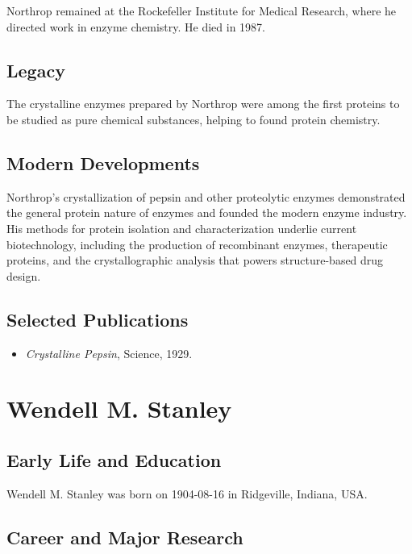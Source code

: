 Northrop remained at the Rockefeller Institute for Medical Research, where he directed work in enzyme chemistry. He died in 1987.

\subsection*{Legacy}

The crystalline enzymes prepared by Northrop were among the first proteins to be studied as pure chemical substances, helping to found protein chemistry.

\subsection*{Modern Developments}

Northrop's crystallization of pepsin and other proteolytic enzymes demonstrated the general protein nature of enzymes and founded the modern enzyme industry. His methods for protein isolation and characterization underlie current biotechnology, including the production of recombinant enzymes, therapeutic proteins, and the crystallographic analysis that powers structure-based drug design.

\subsection*{Selected Publications}

\begin{itemize}

\item \emph{Crystalline Pepsin}, Science, 1929.

\end{itemize}

\clearpage

\section{Wendell M. Stanley}

\subsection*{Early Life and Education}

Wendell M. Stanley was born on 1904-08-16 in Ridgeville, Indiana, USA.

\subsection*{Career and Major Research}


